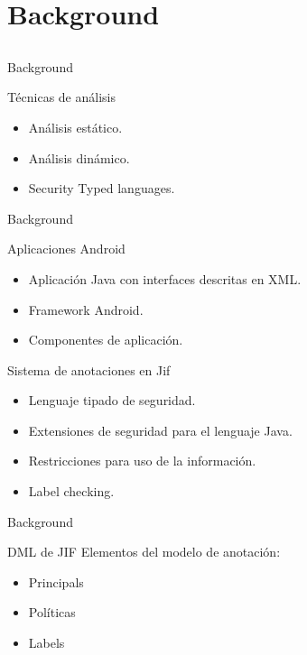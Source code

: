 \section{Background}
\subsection{}
\begin{frame}{Background}
	\begin{block}{Técnicas de análisis}
	\begin{itemize}
	  \item Análisis estático. \pause 
	  \item Análisis dinámico. \pause
	  \item Security Typed languages.
	\end{itemize}
	\end{block}
\end{frame}
\begin{frame}{Background}
	\begin{block}{Aplicaciones Android}
	\begin{itemize}
	  \item Aplicación Java con interfaces descritas en XML.
	  \item Framework Android.
	  \item Componentes de aplicación.
	\end{itemize}
	\pause
	\end{block}
	\begin{block}{Sistema de anotaciones en Jif}
	\begin{itemize}
	  \item Lenguaje tipado de seguridad.
	  \item Extensiones de seguridad para el lenguaje Java.
	  \item Restricciones para uso de la información.
	  \item Label checking.
	\end{itemize}
	\end{block}
\end{frame}
\begin{frame}{Background}
	\begin{block}{DML de JIF}
		Elementos del modelo de anotación:
		\begin{itemize}
		  \item Principals
		  \item Políticas
		  \item Labels
		\end{itemize}
	\end{block}
\end{frame}
